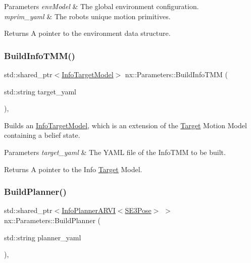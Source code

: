 \begin{DoxyParams}{Parameters}
{\em env\+Model} & The global environment configuration. \\
\hline
{\em mprim\+\_\+yaml} & The robots unique motion primitives. \\
\hline
\end{DoxyParams}
\begin{DoxyReturn}{Returns}
A pointer to the environment data structure. 
\end{DoxyReturn}
\mbox{\label{classnx_1_1Parameters_a161d5a177f864d98b51cc4e517ba37d4}} 
\subsubsection{\texorpdfstring{Build\+Info\+T\+M\+M()}{BuildInfoTMM()}}
{\footnotesize\ttfamily std\+::shared\+\_\+ptr$<$\hyperlink{classnx_1_1InfoTargetModel}{Info\+Target\+Model}$>$ nx\+::\+Parameters\+::\+Build\+Info\+T\+MM (\begin{DoxyParamCaption}\item[{std\+::string}]{target\+\_\+yaml }\end{DoxyParamCaption})\hspace{0.3cm}{\ttfamily [inline]}, {\ttfamily [protected]}}

Builds an \hyperlink{classnx_1_1InfoTargetModel}{Info\+Target\+Model}, which is an extension of the \hyperlink{structnx_1_1Target}{Target} Motion Model containing a belief state. 
\begin{DoxyParams}{Parameters}
{\em target\+\_\+yaml} & The Y\+A\+ML file of the Info\+T\+MM to be built. \\
\hline
\end{DoxyParams}
\begin{DoxyReturn}{Returns}
A pointer to the Info \hyperlink{structnx_1_1Target}{Target} Model. 
\end{DoxyReturn}
\mbox{\label{classnx_1_1Parameters_a371e7560858548bc90e6e43f06a20ba2}} 
\subsubsection{\texorpdfstring{Build\+Planner()}{BuildPlanner()}}
{\footnotesize\ttfamily std\+::shared\+\_\+ptr$<$\hyperlink{classnx_1_1InfoPlannerARVI}{Info\+Planner\+A\+R\+VI}$<$\hyperlink{structnx_1_1SE3Pose}{S\+E3\+Pose}$>$ $>$ nx\+::\+Parameters\+::\+Build\+Planner (\begin{DoxyParamCaption}\item[{std\+::string}]{planner\+\_\+yaml }\end{DoxyParamCaption})\hspace{0.3cm}{\ttfamily [inline]}, {\ttfamily [protected]}}

